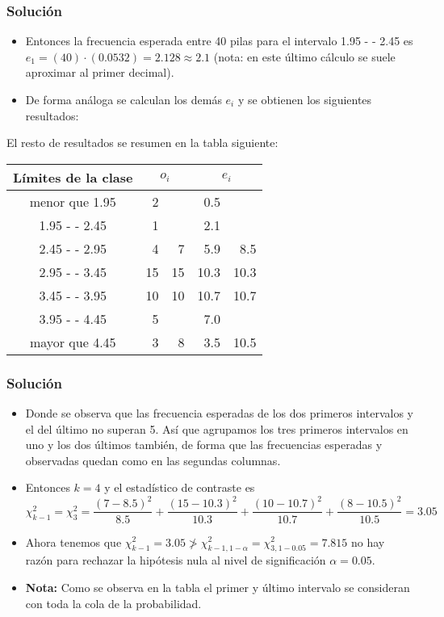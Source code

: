 \begin{frame}
\frametitle{Solución}
\begin{itemize}
\item Entonces la frecuencia esperada entre 40 pilas para el intervalo  1.95 - - 2.45 es $e_{1}=(40)\cdot (0.0532)=2.128\approx 2.1$ (nota: en este último cálculo se suele aproximar al primer decimal).
\item De forma análoga se calculan los demás $e_{i}$ y se obtienen los siguientes resultados:
\end{itemize}
\end{frame}

\begin{frame}
El resto de resultados se resumen en  la tabla siguiente:
\begin{table}
\centering
\begin{tabular}{|c|rr|rr|}
\hline
Límites de la clase &\multicolumn{2}{c|}{$o_{i}$} &
\multicolumn{2}{c|}{$e_{i}$}\\
\hline
menor que  1.95 &   2 &      &   0.5 &      \\
1.95 - -  2.45 &   1 &      &   2.1 &      \\
2.45 - -  2.95 &   4 &    7 &   5.9 &   8.5\\
2.95 - -  3.45 &  15 &   15   &  10.3 &  10.3    \\
3.45 - -  3.95 &  10 &   10   &  10.7 &   10.7   \\
3.95 - -  4.45 &   5 &      &   7.0 &      \\
mayor que 4.45 &   3 &    8 &   3.5 &  10.5\\
\hline
\end{tabular}
\end{table}
\end{frame}

\begin{frame}
\frametitle{Solución}
\begin{itemize}
\item Donde se observa que las frecuencia esperadas de los dos primeros intervalos y el del último no superan 5. Así que agrupamos los tres primeros intervalos en uno y  los dos últimos también, de forma que las frecuencias esperadas y observadas quedan
como en las segundas columnas.
\item Entonces $k=4$ y el estadístico de contraste es
          $$\chi_{k-1}^2=\chi_{3}^2=\frac{(7-8.5)^2}{8.5}+\frac{(15-10.3)^2}{10.3}+
          \frac{(10-10.7)^2}{10.7}+\frac{(8-10.5)^2}{10.5}=3.05$$
\item Ahora  tenemos que  $\chi_{k-1}^2=3.05\not>\chi^2_{k-1,1-\alpha}=\chi^2_{3,1-0.05}=7.815$ no hay razón para rechazar la hipótesis nula al nivel de significación $\alpha=0.05$.
\item \textbf{Nota:} Como se observa en la tabla el primer y último intervalo se consideran con toda la cola de
la probabilidad.
\end{itemize}
\end{frame}

